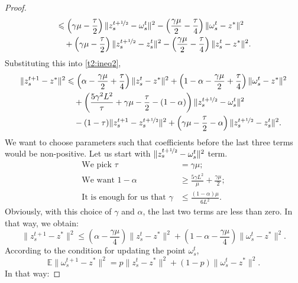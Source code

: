 \documentclass{article}
\begin{document}
\begin{proof}
\begin{align*}
            & \leqslant \left(\gamma\mu - \frac{\tau}{2}\right) \|z_s^{t+\nicefrac{1}{2}} - \omega_s^t\|^2 - \left(\frac{\gamma\mu}{2} - \frac{\tau}{4}\right)\|\omega_s^t - z^*\|^2 \\
            &\quad+ \left(\gamma\mu - \frac{\tau}{2}\right) \|z_s^{t+\nicefrac{1}{2}} - z_s^t\|^2 - \left(\frac{\gamma\mu}{2} - \frac{\tau}{4}\right)\|z_s^t - z^*\|^2.
        \end{align*}
        Substituting this into \eqref{t2:ineq2},
        \begin{align*}
            \|z_s^{t+1} - z^*\|^2 &\leqslant \left(\alpha - \frac{\gamma\mu}{2} + \frac{\tau}{4}\right) \|z_s^t - z^*\|^2 + \left(1-\alpha - \frac{\gamma\mu}{2} + \frac{\tau}{4} \right)\|\omega_s^t - z^*\|^2 \\
            &\quad + \left(\frac{5\gamma^2 L^2}{\tau} + \gamma\mu - \frac{\tau}{2} - (1-\alpha)\right) \|z_s^{t+\nicefrac{1}{2}} - \omega_s^t\|^2 \\
            &\quad - (1-\tau)\|z_s^{t+1} - z_s^{t+\nicefrac{1}{2}}\|^2 + \left(\gamma\mu - \frac{\tau}{2} -\alpha \right)\|z_s^{t+\nicefrac{1}{2}} - z_s^t\|^2.
        \end{align*}
        We want to choose parameters such that coefficients before the last three terms would be non-positive. Let us start with $\|z_s^{t+\nicefrac{1}{2}} - \omega_s^t\|^2$ term. 
        \begin{align*}
            \text{We pick~}\tau &= \gamma\mu;\\
            \text{We want~}1- \alpha &\geqslant \frac{5\gamma L^2}{\mu} + \frac{\gamma \mu}{2};\\
            \text{It is enough for us that~}\gamma &\leqslant \frac{(1-\alpha)\mu}{6L^2}.
         \end{align*}
        Obviously, with this choice of $\gamma$ and $\alpha$, the last two terms are less than zero. In that way, we obtain:
        \begin{equation*}
            \|z_s^{t+1} - z^*\|^2 \leqslant \left(\alpha - \frac{\gamma\mu}{4}\right)\|z_s^t - z^*\|^2 + \left(1 - \alpha - \frac{\gamma\mu}{4}\right)\|\omega_s^t - z^*\|^2.
        \end{equation*}
        According to the condition for updating the point $\omega_s^t$,
        \begin{equation*}
            \mathbb E\|\omega_s^{t+1} - z^*\|^2 = p\|z_s^t - z^*\|^2 + (1-p)\|\omega_s^t - z^*\|^2.
        \end{equation*}
        In that way:

\end{proof}
\end{document}
